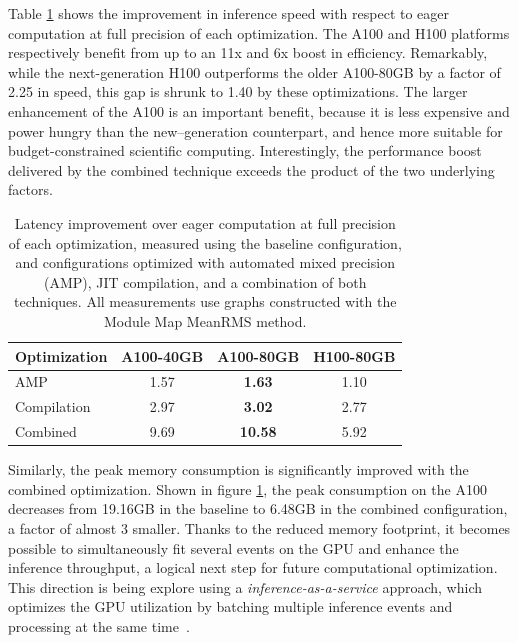 Table \ref{tab:gnn-comp-improve} shows the improvement in inference speed with respect to eager computation at full precision of each optimization. 
The A100 and H100 platforms respectively benefit from up to an 11x and 6x boost in efficiency. 
Remarkably, while the next-generation H100 outperforms the older A100-80GB by a factor of 2.25 in speed, this gap is shrunk to 1.40 by these optimizations. 
The larger enhancement of the A100 is an important benefit, because it is less expensive and power hungry than the new--generation counterpart, and hence more suitable for budget-constrained scientific computing. 
Interestingly, the performance boost delivered by the combined technique exceeds the product of the two underlying factors. 

\begin{table}[h!]
    \centering
    \begin{tabular}{|l|c|c|c|} \hline
        Optimization & {A100-40GB} & {A100-80GB} & {H100-80GB} \\ \hline\hline
        AMP & 1.57 & \textbf{1.63} & 1.10 \\
        Compilation & 2.97 & \textbf{3.02} & 2.77 \\
        Combined & 9.69 & \textbf{10.58} & 5.92 \\ \hline
    \end{tabular}
    \caption{Latency improvement over eager computation at full precision of each optimization, measured using the baseline configuration, and configurations optimized with automated mixed precision (AMP), JIT compilation, and a combination of both techniques. All measurements use graphs constructed with the Module Map MeanRMS method.}
    \label{tab:gnn-comp-improve}
\end{table}

Similarly, the peak memory consumption is significantly improved with the combined optimization.
Shown in figure \ref{tab:gnn-comp-improve}, the peak consumption on the A100 decreases from 19.16GB in the baseline to 6.48GB in the combined configuration, a factor of almost 3 smaller. 
Thanks to the reduced memory footprint, it becomes possible to simultaneously fit several events on the GPU and enhance the inference throughput, a logical next step for future computational optimization.
This direction is being explore using a \textit{inference-as-a-service} approach, which optimizes the GPU utilization by batching multiple inference events and processing
at the same time~\cite{zhao2025trackreconstructionservicecollider}. 

